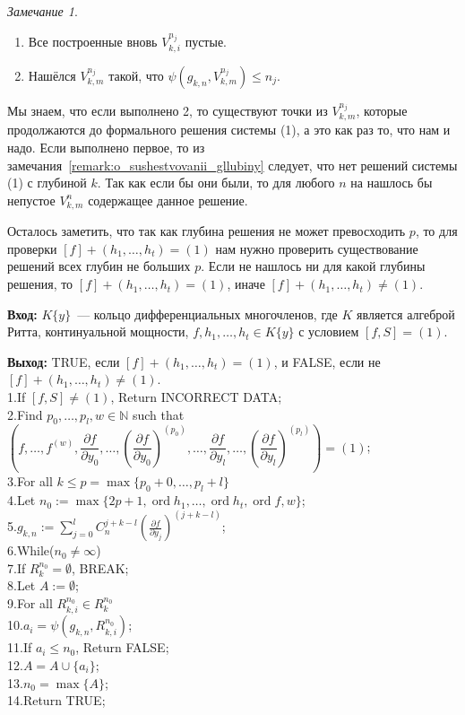 \documentclass[16pt]{article}
\DeclareMathOperator{\ord}{ord}
\renewcommand{\le}{\leqslant} %
\theoremstyle{plain1}
\theoremstyle{plain2}
\theoremstyle{plain}
\theoremstyle{plain3}
\theoremstyle{definition}
\theoremstyle{remark}
\newtheorem{remark}[theorem1]{Замечание}
\begin{document}
\begin{remark}
\begin{enumerate}
  \item Все построенные вновь ${V}_{k,i}^{n_j}$ пустые.
  \item Нашёлся ${V}_{k,m}^{n_j}$ такой, что $ \psi(g_{k,n},{V}_{k,m}^{n_j})\le n_j$.
\end{enumerate}

Мы знаем, что если выполнено 2, то существуют точки из ${V}_{k,m}^{n_j}$, которые продолжаются до формального решения системы (1), а это как раз то, что нам и надо. Если выполнено первое, то из замечания~\ref{remark:o_sushestvovanii_gllubiny} следует, что нет решений системы (1)  с глубиной $k$. Так как если бы они были, то для любого $n$ на нашлось бы непустое ${V}_{k,m}^{n}$ содержащее данное решение.

Осталось заметить, что так как глубина решения не может превосходить $p$, то для проверки $[f]+(h_1,\ldots,h_t)=(1)$ нам нужно проверить существование решений всех глубин не больших $p$. Если не нашлось ни для какой глубины решения, то $[f]+(h_1,\ldots,h_t)=(1)$, иначе $[f]+(h_1,\ldots,h_t)\neq(1)$.
\end{remark}

{\bf Вход:} $K\{y\}$~--- кольцо дифференциальных многочленов, где $K$ является алгеброй Ритта, континуальной мощности, $f,h_1,\ldots,h_t \in K\{y\}$ с условием $[f,S]=(1)$.

{\bf Выход:} TRUE, если  $[f]+(h_1,\ldots,h_t)=(1)$, и FALSE, если не $[f]+(h_1,\ldots,h_t)\not=(1)$.
\\
1.\qquad If $[f,S]\not=(1)$, Return  INCORRECT DATA;\\
2.\qquad Find $p_0, \ldots, p_l, w\in \mathbb{N}$ such that $\left(f,\ldots, f^{(w)}, \dfrac{\partial f}{\partial y_0},\ldots,(\dfrac{\partial f}{\partial y_0})^{(p_0)},\ldots, \dfrac{\partial f}{\partial y_l},\ldots,(\dfrac{\partial f}{\partial y_l})^{(p_l)}\right)=(1)$;\\
3.\qquad For all $k\le p =\max\{ p_0+0,\ldots,p_l+l\} $\\
4.\qquad\qquad Let $n_0:=\max\{ 2p+1,\ord{h_1},\ldots, \ord{h_t},\ord{f},w\}$;\\
5.\qquad\qquad $g_{k,n}:=\sum\limits_{j=0}^{l}C_n^{j+k - l }\left(\frac{\partial f}{\partial y_j}\right)^{(j+k - l)}$;\\
6.\qquad\qquad While($n_0\not=\infty$)\\
7.\qquad\qquad\qquad If $R_k^{n_0}=\emptyset$, BREAK;\\
8.\qquad\qquad\qquad Let $A:=\emptyset$;\\
9.\qquad\qquad\qquad For all ${R}_{k,i}^{n_0}\in R_k^{n_0}$\\
10.\qquad\qquad\qquad\qquad $a_i=\psi(g_{k,n},{R}_{k,i}^{n_0})$;\\
11.\qquad\qquad\qquad\qquad If $a_i\le n_0$, Return FALSE;\\
12.\qquad\qquad\qquad\qquad $A=A\cup\{a_i\}$;\\
13.\qquad\qquad\qquad $n_0=\max\{A\}$;\\
14.\qquad Return TRUE;
\end{document}
